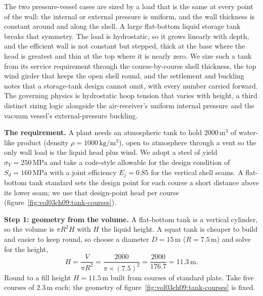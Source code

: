 The two pressure-vessel cases are sized by a load that is the same at every
point of the wall: the internal or external pressure is uniform, and the
wall thickness is constant around and along the shell. A large flat-bottom
liquid storage tank breaks that symmetry. The load is hydrostatic, so it
grows linearly with depth, and the efficient wall is not constant but
stepped, thick at the base where the head is greatest and thin at the top
where it is nearly zero. We size such a tank from its service requirement
through the course-by-course shell thickness, the top wind girder that
keeps the open shell round, and the settlement and buckling notes that a
storage-tank design cannot omit, with every number carried forward. The
governing physics is hydrostatic hoop tension that varies with height, a
third distinct sizing logic alongside the air-receiver's uniform internal
pressure and the vacuum vessel's external-pressure buckling.

\textbf{The requirement.} A plant needs an atmospheric tank to hold
$2000\,\text{m}^3$ of water-like product (density $\rho = 1000\,\si{
\kilogram\per\meter\cubed}$), open to atmosphere through a vent so the only
wall load is the liquid head plus wind. We adopt a steel of yield
$\sigma_Y = 250\,\text{MPa}$ and take a code-style allowable for the design
condition of $S_d = 160\,\text{MPa}$ with a joint efficiency $E_j = 0.85$
for the vertical shell seams. A flat-bottom tank standard sets the design
point for each course a short distance above its lower seam; we use that
design-point head per course (figure~\ref{fig:vol03ch09:tank-courses}).



\textbf{Step 1: geometry from the volume.} A flat-bottom tank is a vertical
cylinder, so the volume is $\pi R^2 H$ with $H$ the liquid height. A squat
tank is cheaper to build and easier to keep round, so choose a diameter
$D = 15\,\si{\meter}$ ($R = 7.5\,\si{\meter}$) and solve for the height,
\[
H = \frac{V}{\pi R^2} = \frac{2000}{\pi\times (7.5)^2}
= \frac{2000}{176.7} = 11.3\,\si{\meter}.
\]
Round to a fill height $H = 11.5\,\si{\meter}$ built from courses of
standard plate. Take five courses of $2.3\,\si{\meter}$ each; the geometry
of figure~\ref{fig:vol03ch09:tank-courses} is fixed.


